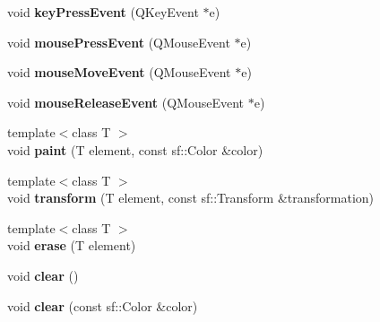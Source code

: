 \begin{DoxyCompactItemize}
\item 
\hypertarget{classophidian_1_1gui_1_1circuit__canvas_a122d30b85dfc7994e33d809462e5d0e5}{void {\bfseries key\-Press\-Event} (Q\-Key\-Event $\ast$e)}\label{classophidian_1_1gui_1_1circuit__canvas_a122d30b85dfc7994e33d809462e5d0e5}

\item 
\hypertarget{classophidian_1_1gui_1_1circuit__canvas_a3815324d89169591e32de822c455117f}{void {\bfseries mouse\-Press\-Event} (Q\-Mouse\-Event $\ast$e)}\label{classophidian_1_1gui_1_1circuit__canvas_a3815324d89169591e32de822c455117f}

\item 
\hypertarget{classophidian_1_1gui_1_1circuit__canvas_a184b6e2c7736ca6b742c022801d0b425}{void {\bfseries mouse\-Move\-Event} (Q\-Mouse\-Event $\ast$e)}\label{classophidian_1_1gui_1_1circuit__canvas_a184b6e2c7736ca6b742c022801d0b425}

\item 
\hypertarget{classophidian_1_1gui_1_1circuit__canvas_a0a30cc6b81ed8fcfec8d6eef4cc5739b}{void {\bfseries mouse\-Release\-Event} (Q\-Mouse\-Event $\ast$e)}\label{classophidian_1_1gui_1_1circuit__canvas_a0a30cc6b81ed8fcfec8d6eef4cc5739b}

\item 
\hypertarget{classophidian_1_1gui_1_1circuit__canvas_ae6d6b2e43e531074cd7b74d5ddb193e1}{{\footnotesize template$<$class T $>$ }\\void {\bfseries paint} (T element, const sf\-::\-Color \&color)}\label{classophidian_1_1gui_1_1circuit__canvas_ae6d6b2e43e531074cd7b74d5ddb193e1}

\item 
\hypertarget{classophidian_1_1gui_1_1circuit__canvas_a6c8551d22054bef4a0285a79b5cfc7ef}{{\footnotesize template$<$class T $>$ }\\void {\bfseries transform} (T element, const sf\-::\-Transform \&transformation)}\label{classophidian_1_1gui_1_1circuit__canvas_a6c8551d22054bef4a0285a79b5cfc7ef}

\item 
\hypertarget{classophidian_1_1gui_1_1circuit__canvas_a876895a42a6efc75c9335e3df410693d}{{\footnotesize template$<$class T $>$ }\\void {\bfseries erase} (T element)}\label{classophidian_1_1gui_1_1circuit__canvas_a876895a42a6efc75c9335e3df410693d}

\item 
\hypertarget{classophidian_1_1gui_1_1circuit__canvas_a158e6dbaec74d9965256cc26ce4348a4}{void {\bfseries clear} ()}\label{classophidian_1_1gui_1_1circuit__canvas_a158e6dbaec74d9965256cc26ce4348a4}

\item 
\hypertarget{classophidian_1_1gui_1_1circuit__canvas_ab3d3466c4c9731c9d1e4aa8755e4c160}{void {\bfseries clear} (const sf\-::\-Color \&color)}\label{classophidian_1_1gui_1_1circuit__canvas_ab3d3466c4c9731c9d1e4aa8755e4c160}

\end{DoxyCompactItemize}
